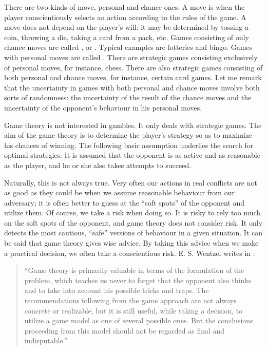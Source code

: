 There are two kinds of move, personal and chance ones. A 
move is when the player conscientiously selects an action according to
the rules of the game. A  move does not depend on the player's
will: it may be determined by tossing a coin, throwing a die, taking
a card from a pack, etc. Games consisting of only chance moves are
called , or . Typical examples are lotteries and bingo. Games with personal moves are called .
There are strategic games consisting exclusively of personal moves, for
instance, chess. There are also strategic games consisting of both
personal and chance moves, for instance, certain card games. Let me
remark that the uncertainty in games with both personal and chance
moves involve both sorts of randomness: the uncertainty of the result of
the chance moves and the uncertainty of the opponent's behaviour in his
personal moves.

Game theory is not interested in gambles. It only deals with strategic
games. The aim of the game theory is to determine the player's strategy
so as to maximize his chances of winning. The following basic
assumption underlies the search for optimal strategies. It is assumed that
the opponent is as active and as reasonable as the player, and he or she
also takes attempts to succeed.

Naturally, this is not always true. Very often our actions in real
conflicts are not as good as they could be when we assume reasonable
behaviour from our adversary; it is often better to guess at the ``soft
spots'' of the opponent and utilize them. Of course, we take a risk when
doing so. It is risky to rely too much on the soft spots of the opponent,
and game theory does not consider risk. It only detects the most
cautious, ``safe'' versions of behaviour in a given situation. It can be said
that game theory gives wise advice. By taking this advice when we make
a practical decision, we often take a conscientious risk. E. S. Wentzel
writes in : 
\begin{quote}
``Game theory is primarily valuable in
terms of the formulation of the problem, which teaches us never to forget that the opponent also thinks and to take into account his possible tricks and traps. The recommendations following from the
game approach are not always concrete or realizable, but it is still
useful, while taking a decision, to utilize a game model as one of several
possible ones. But the conclusions proceeding from this model should
not be regarded as final and indisputable.''
\end{quote}

